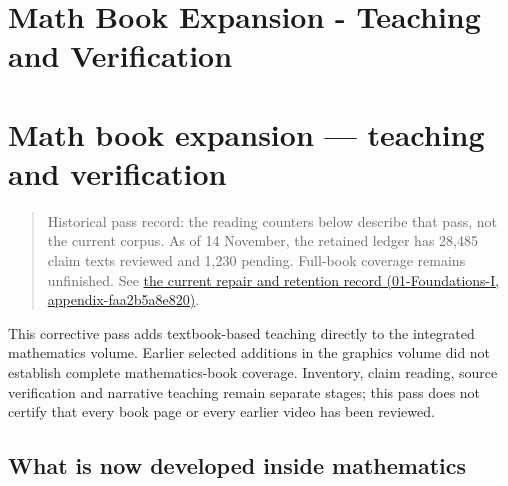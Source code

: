 \hypertarget{appendix-5056f3debc1f}{}
\section*{Math Book Expansion - Teaching and Verification}
\section{Math book expansion --- teaching and verification}\label{math-book-expansion-teaching-and-verification}

\begin{quote}
Historical pass record: the reading counters below describe that pass, not the current corpus. As of 14 November, the retained ledger has 28,485 claim texts reviewed and 1,230 pending. Full-book coverage remains unfinished. See \href{}{the current repair and retention record (01-Foundations-I, appendix-faa2b5a8e820)}.
\end{quote}

This corrective pass adds textbook-based teaching directly to the integrated mathematics volume. Earlier selected additions in the graphics volume did not establish complete mathematics-book coverage. Inventory, claim reading, source verification and narrative teaching remain separate stages; this pass does not certify that every book page or every earlier video has been reviewed.

\subsection{What is now developed inside mathematics}\label{what-is-now-developed-inside-mathematics}

